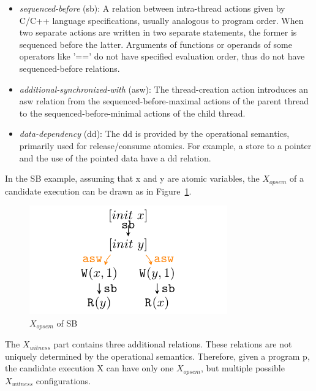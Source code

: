 \begin{itemize}
	\item \textit{sequenced-before} (sb): A relation between intra-thread actions given by C/C++ language specifications, usually analogous to program order. When two separate actions are written in two separate statements, the former is sequenced before the latter. Arguments of functions or operands of some operators like '==' do not have specified evaluation order, thus do not have sequenced-before relations.
	\item \textit{additional-synchronized-with} (asw): The thread-creation action introduces an asw relation from the sequenced-before-maximal actions of the parent thread to the sequenced-before-minimal actions of the child thread.
	\item \textit{data-dependency} (dd):  The dd is provided by the operational semantics, primarily used for release/consume atomics. For example, a store to a pointer and the use of the pointed data have a dd relation.
\end{itemize}

In the SB example,  assuming that x and y are atomic variables, the $X_{opsem}$ of a candidate execution can be drawn as in Figure~\ref{XopsemSB}.

\begin{figure}[h!tbp] %
	\centering
	\includegraphics[scale=1.3]{figure/exec-graph/SB1.pdf} %
	\caption{$X_{opsem}$ of SB} %
	\label{XopsemSB} %
\end{figure}

The $X_{witness}$ part contains three additional relations. These relations are not uniquely determined by the operational semantics. Therefore, given a program p, the candidate execution X can have only one $X_{opsem}$, but multiple possible $X_{witness}$ configurations.

